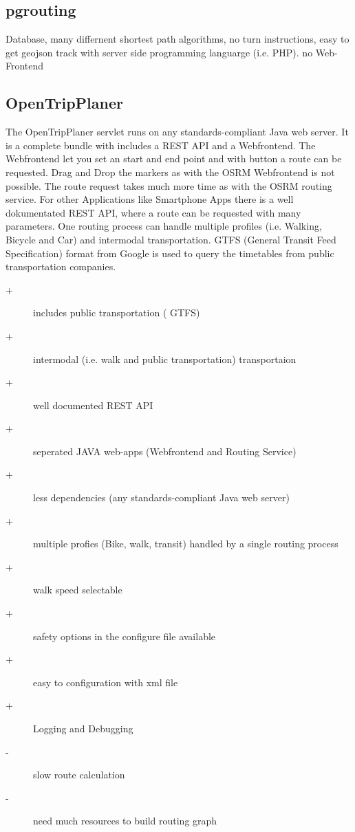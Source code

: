 \documentclass{sig-alternate}
\begin{document}
\subsection{pgrouting\cite{pgrouting}}
Database, many differnent shortest path algorithms, no turn instructions, easy to get geojson track with server side programming languarge (i.e. PHP). no Web-Frontend




\subsection{OpenTripPlaner}
\label{subsec:otp}
 
The OpenTripPlaner servlet runs on any standards-compliant Java web server. It is a complete bundle with includes a REST API and a Webfrontend. The Webfrontend let you set an start and end point and with button a route can be requested. Drag and Drop the markers as with the OSRM Webfrontend is not possible. The route request takes much more time as with the OSRM routing service. For other Applications like Smartphone Apps there is a well dokumentated REST API, where a route can be requested with many parameters. One routing process can handle multiple profiles (i.e. Walking, Bicycle and Car) and intermodal transportation. GTFS (General Transit Feed Specification) format from Google is used to query the timetables from public transportation companies. 

\begin{description}
  \item[+] includes public transportation ( GTFS)
  \item[+] intermodal (i.e. walk and public transportation) transportaion
  \item[+] well documented REST API
  \item[+] seperated JAVA web-apps (Webfrontend and Routing Service)
  \item[+] less dependencies (any standards-compliant Java web server)
  \item[+] multiple profies (Bike, walk, transit) handled by a single routing process
  \item[+] walk speed selectable
  \item[+] safety options in the configure file available
  \item[+] easy to configuration with xml file
  \item[+] Logging and Debugging 
  \item[-] slow route calculation
  \item[-] need much resources to build routing graph   
\end{description} 
 
\end{document}
